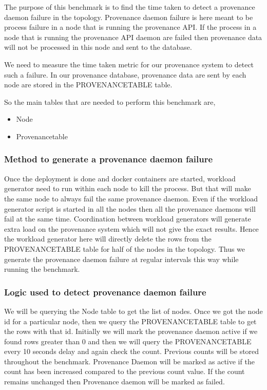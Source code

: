 The purpose of this benchmark is to find the time taken to detect a provenance daemon failure in the topology. Provenance daemon failure is here meant to be process failure in a node that is running the provenance API. If the process in a node that is running the provenance API daemon are failed then provenance data will not be processed in this node and sent to the database.

We need to measure the time taken metric for our provenance system to detect such a failure. In our provenance database, provenance data are sent by each node are stored in the PROVENANCETABLE table.

So the main tables that are needed to perform this benchmark are,
    \begin{itemize}
        \item Node
        \item Provenancetable
    \end{itemize}

\subsubsection{Method to generate a provenance daemon failure}

Once the deployment is done and docker containers are started, workload generator need to run within each node to kill the process. But that will make the same node to always fail the same provenance daemon. Even if the workload generator script is started in all the nodes then all the provenance daemons will fail at the same time. Coordination between workload generators will generate extra load on the provenance system which will not give the exact results. Hence the workload generator here will directly delete the rows from the PROVENANCETABLE table for half of the nodes in the topology. Thus we generate the provenance daemon failure at regular intervals this way while running the benchmark.

\subsubsection{Logic used to detect provenance daemon failure}

We will be querying the Node table to get the list of nodes. Once we got the node id for a particular node, then we query the PROVENANCETABLE table to get the rows with that id. Initially we will mark the provenance daemon active if we found rows greater than 0 and then we will query the PROVENANCETABLE every 10 seconds delay and again check the count. Previous counts will be stored throughout the benchmark. Provenance Daemon will be marked as active if the count has been increased compared to the previous count value. If the count remains unchanged then Provenance daemon will be marked as failed.

